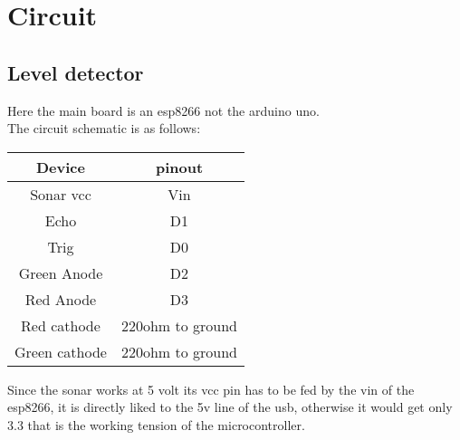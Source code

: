 \section{Circuit}
\subsection{Level detector}
Here the main board is an esp8266 not the arduino uno.\\
The circuit schematic is as follows:\\
\begin{center}
    \begin{tabular}{|c|c|}
        \hline
        Device             & pinout \\
        \hline
        \hline
        Sonar vcc & Vin     \\
        \hline
        Echo                & D1      \\
        \hline
        Trig                 & D0      \\
        \hline
        Green Anode                 & D2      \\
        \hline
        Red Anode                 & D3      \\
        \hline
        Red cathode              & 220ohm to ground      \\
        \hline
        Green cathode              & 220ohm to ground     \\
        \hline
    \end{tabular}
\end{center}
Since the sonar works at 5 volt its vcc pin has to be fed by the vin of the esp8266, it is directly liked to the 5v line of the usb, otherwise it would get only 3.3 that is the working tension of the microcontroller.
\pagebreak

